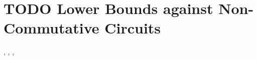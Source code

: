 \chapter{TODO Lower Bounds against Non-Commutative Circuits}
\label{chap:nc-ckts}

\cite{CH23}, \cite{Sha26a}, \cite{Raz26}, \cite{Sha26b}
